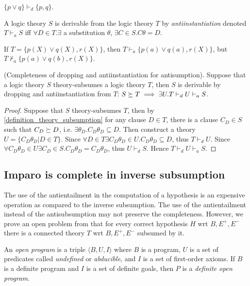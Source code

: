 \begin{exmp}
$\{p \lor q\} \vdash_d \{p, q\}$.
\end{exmp}

\begin{defn}
A logic theory $S$ is derivable from the logic theory $T$ by \emph{antiinstantiation} denoted $T \vdash_a S$ iff
$\forall D \in T. \exists$ a substitution $\theta$, $\exists C \in S. C\theta = D$.
\end{defn}

\begin{exmp}
If $T=\{p(X) \lor q(X), r(X)\}$, then $T\vdash_a\{p(a) \lor q(a), r(X)\}$,
but $T\not\vdash_a\{p(a) \lor q(b), r(X)\}$.
\end{exmp}

\begin{proposition}(Completeness of dropping and antiinstantiation for antisumption).
Suppose that a logic theory $S$ theory-subsumes a logic theory $T$, then $S$ is derivable by dropping and antiinstantiation from $T$:
$S \succeq T \implies \exists U. T \vdash_d U \vdash_a S$.
\end{proposition}
\begin{proof}
Suppose that $S$ theory-subsumes $T$, then by \ref{definition_theory_subsumption} for any clause $D \in T$, there is a clause $C_D \in S$ such
that $C_D \succeq D$, i.e. $\exists \theta_{D}. C_D \theta_D \subseteq D$.
Then construct a theory $U=\{C_D \theta_D | D \in T \}$.
Since $\forall D \in T \exists C_D \theta_D \in U. C_D \theta_D \subseteq D$, thus $T \vdash_d U$.
Since $\forall C_D \theta_D \in U \exists C_D \in S. C_D \theta_D=C_D \theta_D$, thus $U \vdash_d S$. Hence $T \vdash_d U \vdash_a S$.
\end{proof}

\subsection{Imparo is complete in inverse subsumption}
The use of the antientailment\cite{yamamoto2012inverse} in the computation of a hypothesis is an expensive operation as compared to the inverse subsumption. The use of the antientailment instead of the antisubsumption may not preserve the completeness. However, we prove an open problem from \cite{yamamoto2012inverse} that for every correct hypothesis $H$ wrt $B, E^{+}, E^{-}$ there is a connected theory $T$ wrt $B, E^{+}, E^{-}$ subsumed by it.

\begin{defn}\cite{kimber2012learning}
An \emph{open program} is a triple $\langle B, U, I \rangle$ where $B$ is a program, $U$ is a set of predicates called \emph{undefined} or \emph{abducible}, and $I$ is a set of first-order
axioms. If $B$ is a definite program and $I$ is a set of definite goals, then $P$ is a 
\emph{definite open program}.
\end{defn}

